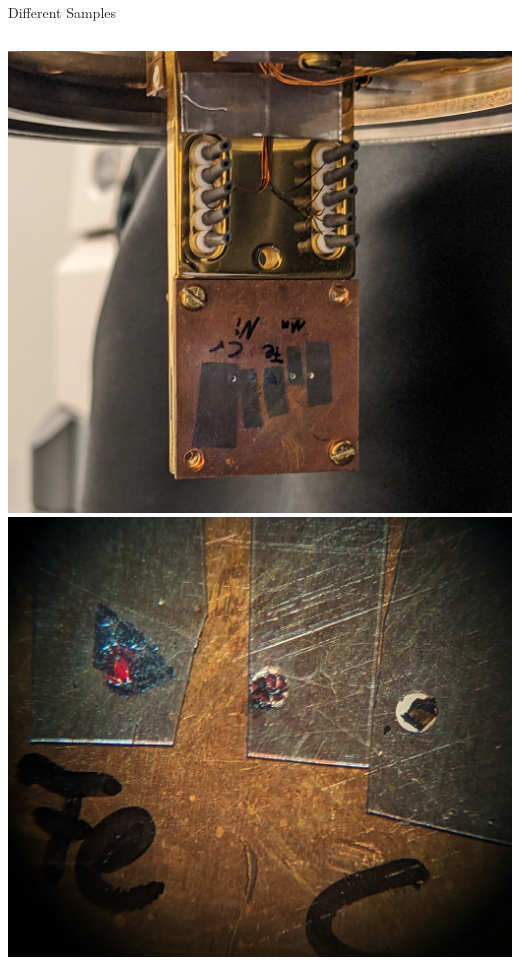 \documentclass[
	10pt,
]{beamer}
\begin{document}
\begin{frame}{Different Samples}
\begin{columns}
		\centering
		\includegraphics[width=\textwidth]{../../photos/transmission holder.jpg}
		\includegraphics[width=\textwidth]{../../photos/transmission samples.jpg}
	\end{columns}
\end{frame}
\end{document}
